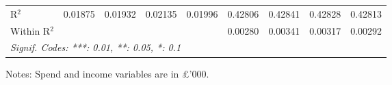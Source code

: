 \begin{table}[htbp]
\begin{threeparttable}[b]
\begin{tabular}{lcccccccc}
         R$^2$                  & 0.01875          & 0.01932          & 0.02135          & 0.01996          & 0.42806         & 0.42841         & 0.42828         & 0.42813\\  
         Within R$^2$           &                  &                  &                  &                  & 0.00280         & 0.00341         & 0.00317         & 0.00292\\  
         \midrule \midrule
         \multicolumn{9}{l}{\emph{Signif. Codes: ***: 0.01, **: 0.05, *: 0.1}}\\
      \end{tabular}
      
      \begin{tablenotes}\footnotesize
         \item Notes: Spend and income variables are in \pounds'000.
      \end{tablenotes}
   \end{threeparttable}
\end{table}


